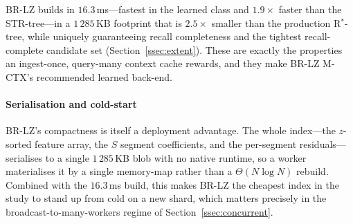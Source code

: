 BR-LZ builds in $16.3$\,ms---fastest in the learned class and
$1.9\times$ faster than the STR-tree---in a $1\,285$\,KB footprint that is
$2.5\times$ smaller than the production R$^{*}$-tree, while uniquely
guaranteeing recall completeness and the tightest recall-complete
candidate set (Section~\ref{ssec:extent}). These are exactly the
properties an ingest-once, query-many context cache rewards, and they make
BR-LZ M-CTX's recommended learned back-end.

\paragraph*{Serialisation and cold-start}
BR-LZ's compactness is itself a deployment advantage. The whole index---the
$z$-sorted feature array, the $S$ segment coefficients, and the per-segment
residuals---serialises to a single $1\,285$\,KB blob with no native
runtime, so a worker materialises it by a single memory-map rather than a
$\Theta(N\log N)$ rebuild. Combined with the $16.3$\,ms build, this makes
BR-LZ the cheapest index in the study to stand up from cold on a new shard,
which matters precisely in the broadcast-to-many-workers regime of
Section~\ref{ssec:concurrent}.

